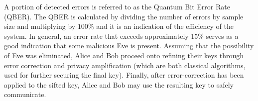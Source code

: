 A portion of detected errors is referred to as the Quantum Bit Error Rate (QBER). 
The QBER is calculated by dividing the number of errors by sample size and multiplying by $100\%$ 
and it is an indication of the efficiency of the system. In general, an error rate that exceeds 
approximately $15\%$ serves as a good indication that some malicious Eve is present.
Assuming that the possibility of Eve was eliminated, Alice and Bob proceed onto refining
their keys through error correction and privacy amplification (which are both classical
algorithms, used for further securing the final key). 
Finally, after error-correction has been applied to the sifted key, Alice and Bob may use 
the resulting key to safely communicate.
